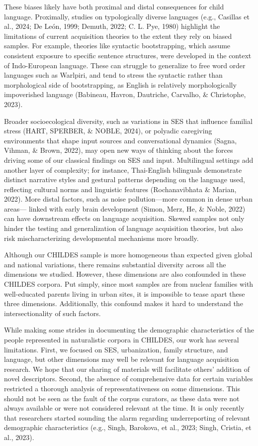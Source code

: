 \documentclass[
  man,floatsintext]{apa6}
\begin{document}
These biases likely have both proximal and distal consequences for child language. Proximally, studies on typologically diverse languages (e.g., Casillas et al., 2024; De León, 1999; Demuth, 2022; C. L. Pye, 1980) highlight the limitations of current acquisition theories to the extent they rely on biased samples. For example, theories like syntactic bootstrapping, which assume consistent exposure to specific sentence structures, were developed in the context of Indo-European language. These can struggle to generalize to free word order languages such as Warlpiri, and tend to stress the syntactic rather than morphological side of bootstrapping, as English is relatively morphologically impoverished language (Babineau, Havron, Dautriche, Carvalho, \& Christophe, 2023).

Broader socioecological diversity, such as variations in SES that influence familial stress (HART, SPERBER, \& NOBLE, 2024), or polyadic caregiving environments that shape input sources and conversational dynamics (Sagna, Vihman, \& Brown, 2022), may open new ways of thinking about the forces driving some of our classical findings on SES and input. Multilingual settings add another layer of complexity; for instance, Thai-English bilinguals demonstrate distinct narrative styles and gestural patterns depending on the language used, reflecting cultural norms and linguistic features (Rochanavibhata \& Marian, 2022).
More distal factors, such as noise pollution---more common in dense urban areas--- linked with early brain development (Simon, Merz, He, \& Noble, 2022) can have downstream effects on language acquisition. Skewed samples not only hinder the testing and generalization of language acquisition theories, but also risk mischaracterizing developmental mechanisms more broadly.

Although our CHILDES sample is more homogeneous than expected given global and national variations, there remains substantial diversity across all the dimensions we studied. However, these dimensions are also confounded in these CHILDES corpora. Put simply, since most samples are from nuclear families with well-educated parents living in urban sites, it is impossible to tease apart these three dimensions. Additionally, this confound makes it hard to understand the intersectionality of such factors.

While making some strides in documenting the demographic characteristics of the people represented in naturalistic corpora in CHILDES, our work has several limitations. First, we focused on SES, urbanization, family structure, and language, but other dimensions may well be relevant for language acquisition research. We hope that our sharing of materials will facilitate others' addition of novel descriptors. Second, the absence of comprehensive data for certain variables restricted a thorough analysis of representativeness on some dimensions. This should not be seen as the fault of the corpus curators, as these data were not always available or were not considered relevant at the time. It is only recently that researchers started sounding the alarm regarding underreporting of relevant demographic characteristics (e.g., Singh, Barokova, et al., 2023; Singh, Cristia, et al., 2023).
\end{document}
